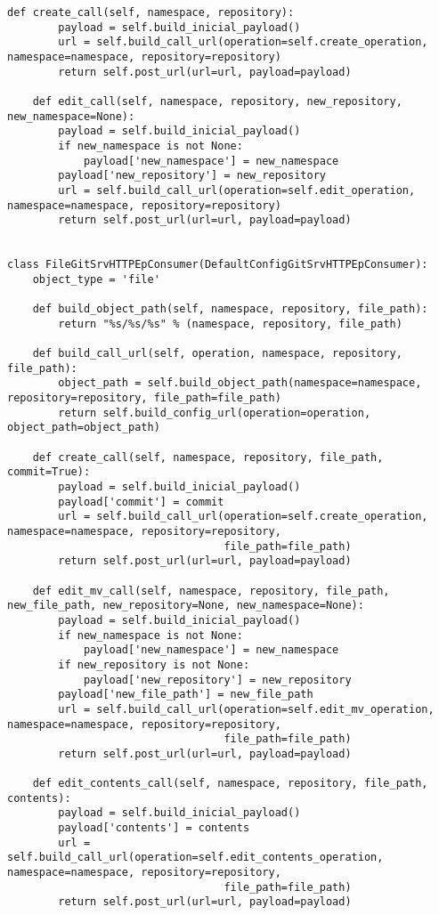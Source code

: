 \begin{lstlisting}[breaklines]
    def create_call(self, namespace, repository):
        payload = self.build_inicial_payload()
        url = self.build_call_url(operation=self.create_operation, namespace=namespace, repository=repository)
        return self.post_url(url=url, payload=payload)

    def edit_call(self, namespace, repository, new_repository, new_namespace=None):
        payload = self.build_inicial_payload()
        if new_namespace is not None:
            payload['new_namespace'] = new_namespace
        payload['new_repository'] = new_repository
        url = self.build_call_url(operation=self.edit_operation, namespace=namespace, repository=repository)
        return self.post_url(url=url, payload=payload)


class FileGitSrvHTTPEpConsumer(DefaultConfigGitSrvHTTPEpConsumer):
    object_type = 'file'

    def build_object_path(self, namespace, repository, file_path):
        return "%s/%s/%s" % (namespace, repository, file_path)

    def build_call_url(self, operation, namespace, repository, file_path):
        object_path = self.build_object_path(namespace=namespace, repository=repository, file_path=file_path)
        return self.build_config_url(operation=operation, object_path=object_path)

    def create_call(self, namespace, repository, file_path, commit=True):
        payload = self.build_inicial_payload()
        payload['commit'] = commit
        url = self.build_call_url(operation=self.create_operation, namespace=namespace, repository=repository,
                                  file_path=file_path)
        return self.post_url(url=url, payload=payload)

    def edit_mv_call(self, namespace, repository, file_path, new_file_path, new_repository=None, new_namespace=None):
        payload = self.build_inicial_payload()
        if new_namespace is not None:
            payload['new_namespace'] = new_namespace
        if new_repository is not None:
            payload['new_repository'] = new_repository
        payload['new_file_path'] = new_file_path
        url = self.build_call_url(operation=self.edit_mv_operation, namespace=namespace, repository=repository,
                                  file_path=file_path)
        return self.post_url(url=url, payload=payload)

    def edit_contents_call(self, namespace, repository, file_path, contents):
        payload = self.build_inicial_payload()
        payload['contents'] = contents
        url = self.build_call_url(operation=self.edit_contents_operation, namespace=namespace, repository=repository,
                                  file_path=file_path)
        return self.post_url(url=url, payload=payload)


\end{lstlisting}
